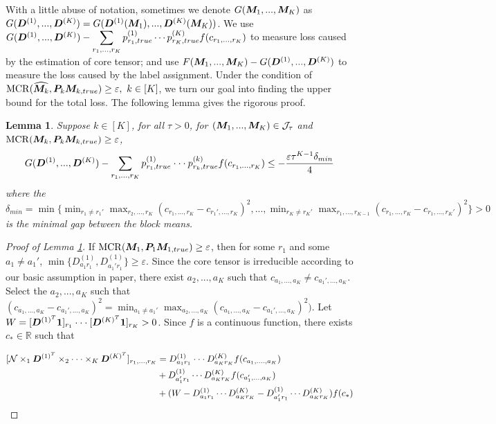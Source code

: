 \documentclass{article}
\newtheorem{lemma}{Lemma}
\DeclareMathOperator*{\mcr}{MCR}
\begin{document}
\begin{appendices}
With a little abuse of notation, sometimes we denote $G(\boldsymbol{M}_1,...,\boldsymbol{M}_K)$ as $G(\boldsymbol{D}^{(1)},...,\boldsymbol{D}^{(K)}) = G(\boldsymbol{D}^{(1)}(\boldsymbol{M}_1),...,\boldsymbol{D}^{(K)}(\boldsymbol{M}_K))$. We use $ G(\boldsymbol{D}^{(1)},...,\boldsymbol{D}^{(K)})-\displaystyle\sum_{r_1,...,r_K}p_{r_1,true}^{(1)} \cdots p_{r_K,true}^{(K)}f(c_{r_1,...,r_K})$ to measure loss caused by the estimation of core tensor; and use $F(\boldsymbol{M}_1,...,\boldsymbol{M}_K)-G(\boldsymbol{D}^{(1)},...,\boldsymbol{D}^{(K)})$ to measure the loss caused by the label assignment. 
 Under the condition of $\mcr(\widehat{\mM_k}, \mP_k\mM_{k,true})\geq \varepsilon,~k\in[K]$, we
  turn our goal into finding the upper bound for the total loss. The following lemma gives the rigorous proof.
 \begin{lemma}
\label{1}
Suppose $k\in[K]$, for all $\tau>0$, for $(\boldsymbol{M}_1,...,\boldsymbol{M}_K)\in \mathcal{J}_\tau$ and $\mcr(\mM_k, \mP_k\mM_{k,true})\geq \varepsilon$,
\begin{equation*}
    G(\boldsymbol{D}^{(1)},...,\boldsymbol{D}^{(K)})-\displaystyle\sum_{r_1,...,r_K}p_{r_1,true}^{(1)}\cdot\cdot\cdot p_{r_k,true}^{(k)}f(c_{r_1,...,r_K})\leq -\frac{\varepsilon\tau^{K-1}\delta_{min}}{4}
\end{equation*}
where the $\delta_{min}=\min\{\displaystyle\min_{r_1\neq r_1'}\max_{r_2,...,r_K}(c_{r_1,...,r_K}-c_{r_1',...,r_K})^2,...,\displaystyle\min_{r_K\neq r_K'}\max_{r_1,...,r_{K-1}}(c_{r_1,...,r_K}-c_{r_1,...,r_K'})^2\}>0$ is the minimal gap between the block means. %
\end{lemma}

\begin{proof}[Proof of Lemma \ref{1}]
If $\mcr(\mM_1, \mP_1\mM_{1,true})\geq \varepsilon$, then for some $r_1$ and some $a_1\neq a_1'$, $\min\{D_{a_1r_1}^{(1)}, D_{a_1'r_1}^{(1)}\}\geq \varepsilon$. Since the core tensor is irreducible according to our basic assumption in paper, there exist $a_2,...,a_K$ such that $c_{a_1,...,a_K}\neq c_{a_1',...,a_K}$. Select the $a_2,...,a_K$ such that $(c_{a_1,...,a_K}-c_{a_1',...,a_K})^2 = \displaystyle\min_{a_1\neq a_1'}\max_{a_2,...,a_K}(c_{a_1,...,a_K}-c_{a_1',...,a_K})^2)$. 
Let $W = [\boldsymbol{D}^{(1)^T}\boldsymbol{1}]_{r_1}\cdot\cdot\cdot [\boldsymbol{D}^{(K)^T}\boldsymbol{1}]_{r_K}>0$. Since $f$ is a continuous function, there exists $c_*\in\mathbb{R}$ such that

\begin{equation}
\begin{split}
    [\mathcal{N}\times_1\boldsymbol{D}^{(1)^T}\times_2\cdot\cdot\cdot\times_K \boldsymbol{D}^{(K)^T}]_{r_1,...,r_K}&=
 D_{a_1r_1}^{(1)}\cdot\cdot\cdot D_{a_Kr_K}^{(K)}f(c_{a_1,....,a_K})\\
 &+D_{a_1'r_1}^{(1)}\cdots D_{a_Kr_K}^{(K)}f(c_{a_1',...,a_K})\\
    &+(W-D_{a_1r_1}^{(1)}\cdots D_{a_Kr_K}^{(K)}-D_{a_1'r_1}^{(1)}\cdots D_{a_Kr_K}^{(K)})f(c_*)
\end{split}
\end{equation}


\end{proof}
\end{appendices}
\end{document}
